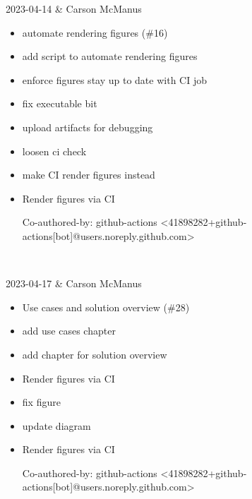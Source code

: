 2023-04-14 & Carson McManus
\begin{itemize}[topsep=0pt,itemsep=0pt,parsep=0pt,partopsep=0pt,leftmargin=12pt]
\item automate rendering figures (\#16)

\item add script to automate rendering figures

\item enforce figures stay up to date with CI job

\item fix executable bit

\item upload artifacts for debugging

\item loosen ci check

\item make CI render figures instead

\item Render figures via CI



Co-authored-by: github-actions <41898282+github-actions[bot]@users.noreply.github.com>
\end{itemize}
\\ \hline

2023-04-17 & Carson McManus
\begin{itemize}[topsep=0pt,itemsep=0pt,parsep=0pt,partopsep=0pt,leftmargin=12pt]
\item Use cases and solution overview (\#28)

\item add use cases chapter

\item add chapter for solution overview

\item Render figures via CI

\item fix figure

\item update diagram

\item Render figures via CI



Co-authored-by: github-actions <41898282+github-actions[bot]@users.noreply.github.com>
\end{itemize}
\\ \hline


